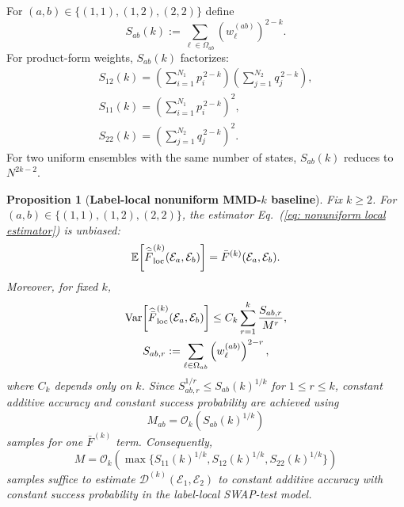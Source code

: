 \documentclass[aps,prx,reprint,superscriptaddress,amsmath,amssymb,longbibliography,floatfix]{revtex4-2}
\newcommand{\dsE}{\mathbb{E}}
\newcommand{\scD}{\mathcal{D}}
\newcommand{\scE}{\mathcal{E}}
\newcommand{\scO}{\mathcal{O}}
\theoremstyle{plain}
\newtheorem{proposition}[theorem]{Proposition}
\theoremstyle{definition}
\theoremstyle{remark}
\begin{document}
For $(a,b)\in\{(1,1),(1,2),(2,2)\}$ define
\begin{equation}
    S_{ab}(k)
    :=
    \sum_{\ell\in\Omega_{ab}}
    \left(w^{(ab)}_\ell\right)^{2-k}.
    \label{eq: Sab_def}
\end{equation}
For product-form weights, \(S_{ab}(k)\) factorizes:
\begin{equation}
\begin{gathered}
S_{12}(k)=
    \left(\sum_{i=1}^{N_1} p_i^{\,2-k}\right)
    \left(\sum_{j=1}^{N_2} q_j^{\,2-k}\right),
    \\
    S_{11}(k)=
    \left(\sum_{i=1}^{N_1} p_i^{\,2-k}\right)^2,
    \\
    S_{22}(k)=
    \left(\sum_{j=1}^{N_2} q_j^{\,2-k}\right)^2 .
    \label{eq: Sab_factor}
\end{gathered}
\end{equation}
For two uniform ensembles with the same number of states, \(S_{ab}(k)\) reduces to \(N^{2k-2}\).

\begin{proposition}[\textbf{Label-local nonuniform MMD-\(k\) baseline}]
    \label{prop: nonuniform local SWAP baseline}
    Fix \(k\ge2\). For \((a,b)\in\{(1,1),(1,2),(2,2)\}\), the estimator Eq.~(\ref{eq: nonuniform local estimator}) is unbiased:
    \begin{equation}
        \dsE\!\left[
            \widehat{\bar F}^{(k)}_{\rm loc}(\scE_a,\scE_b)
        \right]
        =
        \bar F^{(k)}(\scE_a,\scE_b).
\label{eq:app-nonuniform-local-estimator-unbiasedness}
\end{equation}
    Moreover, for fixed \(k\),
    \begin{equation}
\begin{gathered}
\operatorname{Var}\!\left[
            \widehat{\bar F}^{(k)}_{\rm loc}(\scE_a,\scE_b)
        \right]
        \le
        C_k
        \sum_{r=1}^k
        \frac{S_{ab,r}}{M^r},
        \\
        S_{ab,r}:=
        \sum_{\ell\in\Omega_{ab}}
        \left(w_\ell^{(ab)}\right)^{2-r},
        \label{eq: nonuniform local variance}
\end{gathered}
\end{equation}
    where \(C_k\) depends only on \(k\). Since \(S_{ab,r}^{1/r}\le S_{ab}(k)^{1/k}\) for \(1\le r\le k\), constant additive accuracy and constant success probability are achieved using
    \begin{equation}
        M_{ab}
        =
        \scO_k\!\left(
            S_{ab}(k)^{1/k}
        \right)
        \label{eq: nonuniform local scale k collision}
    \end{equation}
    samples for one \(\bar F^{(k)}\) term. Consequently,
    \begin{equation}
        M
        =
        \scO_k\!\left(
            \max\{
                S_{11}(k)^{1/k},
                S_{12}(k)^{1/k},
                S_{22}(k)^{1/k}
            \}
        \right)
        \label{eq: nonuniform local MMD scale}
    \end{equation}
    samples suffice to estimate \(\scD^{(k)}(\scE_1,\scE_2)\) to constant additive accuracy with constant success probability in the label-local SWAP-test model.
\end{proposition}
\end{document}
